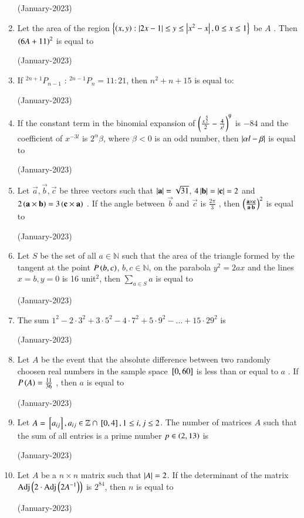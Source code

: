 \documentclass[journal]{IEEEtran}
\begin{document}
\begin{enumerate}
\hfill(January-2023)

\item Let the area of the region $\left\{\left(x,y\right) : \left\vert2x-1\right\vert \leq y \leq \left\vert x^2 - x\right\vert, 0 \leq x \leq 1\right\}$
 be $A$ . Then $\left(6A + 11\right)^2$  
 is equal to 

 \hfill(January-2023)

 \item If $^{2n+1}P_{n-1} \text{ : } ^{2n-1}P_n = 11:21$, then $n^2 + n +15$ is equal to:

\hfill (January-2023)

\item If the constant term in the binomial expansion of 
$\left(\frac{x^{\frac{5}{2}}}{2} - \frac{4}{x^l}\right)^9$ is $-84$ and the coefficient of $x^{-3l}$ 
 is $2^{\alpha}\beta$, where $\beta < 0$
 is an odd number, then $\left\vert\alpha l - \beta\right\vert$
 is equal to

 \hfill(January-2023)

 \item Let $\vec{a}, \vec{b}, \vec{c}$
 be three vectors such that
$\left\vert\mathbf{a}\right\vert = \sqrt{31}$, $4\left\vert\mathbf{b}\right\vert = \left\vert\mathbf{c}\right\vert = 2$
 and $2\left(\mathbf{a} \times \mathbf{b}\right) = 3 \left(\mathbf{c} \times \mathbf{a}\right)$
. If the angle between $\vec{b}$
 and $\vec{c}$
 is $\frac{2\pi}{3}$
, then $\left(\frac{\mathbf{a} \times \mathbf{c}}{\mathbf{a}\cdot \mathbf{b}}\right)^2$ is equal to

\hfill (January-2023)

\item Let $S$ be the set of all $a \in \mathbb{N}$ such that the area of the triangle formed by the tangent at the point $P\left(b,c\right)$, $b,c \in \mathbb{N}$, on the parabola $y^2 = 2ax $ and the lines $x = b, y = 0 $ is 16 unit$^2$, then $\sum_{a \in S} a $ is equal to 

\hfill (January-2023)

\item The sum $1^2 - 2\cdot3^2 + 3\cdot5^2 - 4\cdot7^2 + 5\cdot9^2 - \dots + 15\cdot29^2$ is 

\hfill(January-2023)

\item Let $A$ be the event that the absolute difference between two randomly choosen real numbers in the sample space ${}\left[0,60\right]$
 is less than or equal to $a$ . If $P\left(A\right) = \frac{11}{36}$ , then $a$ 
 is equal to 

 \hfill (January-2023)

 \item Let $A = {}\left[a_{ij}\right], a_{ij} \in \mathbb{Z} \cap {}\left[0,4\right], 1 \leq i,j \leq 2$. 
The number of matrices $A$ such that the sum of all entries is a prime number $p \in \left(2,13\right)$ is 

\hfill (January-2023)

\item Let $A$ be a $n \times n $ matrix such that $\left\vert A\right\vert = 2$. If the determinant of the matrix $\operatorname{Adj}\left(2\cdot \operatorname{Adj}\left(2A^{-1}\right)\right)$ is $2^{84}$, then $n$ is equal to 

\hfill (January-2023)
\end{enumerate}
\end{document}
